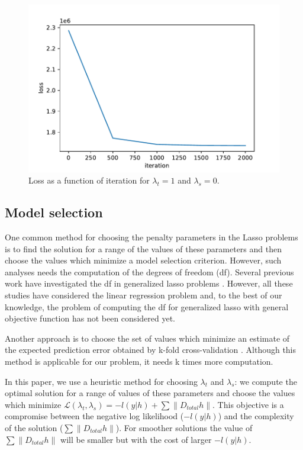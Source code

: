 \documentclass[review]{elsarticle}
\begin{document}
\begin{figure}[ht]
	\vskip 0.2in
	\begin{center}
		\centerline{\includegraphics[width=1\columnwidth]{Figures/loss_vs_iter}}
		\caption{Loss as a function of iteration for $\lambda_t=1$ and $\lambda_s=0$.}
		\label{fig:loss_vs_iter}
	\end{center}
	\vskip -0.2in
\end{figure}

\subsection{Model selection}
One common method for choosing the penalty parameters in the Lasso problems is to find the solution for a range of the values of these parameters and then choose the values which minimize a model selection criterion. However, such analyses needs the computation of the degrees of freedom (df). Several previous work have investigated the df in generalized lasso problems \cite{tibshirani_degrees_2012,hu_dual_2015,zeng_geometry_2017}. However, all these studies have considered the linear regression problem and, to the best of our knowledge, the problem of computing the df for generalized lasso with general objective function has not been considered yet.

Another approach is to choose the set of values which minimize an estimate of the expected prediction error obtained by k-fold cross-validation \cite{tibshirani_regression_1996} . Although this method is applicable for our problem, it needs k times more computation.

In this paper, we use a heuristic method for choosing $\lambda_t$ and $\lambda_s$: we compute the optimal solution for a range of values of these parameters and choose the values which minimize $\mathscr{L}(\lambda_t,\lambda_s)=-l(y|h)+ \sum \lVert D_{total}h \lVert$. This objective is a compromise between the negative log likelihood ($-l(y|h)$) and the complexity of the solution ($\sum \lVert D_{total}h \lVert$). For smoother solutions the value of $\sum \lVert D_{total}h \lVert$ will be smaller but with the cost of larger $-l(y|h)$.
\end{document}

